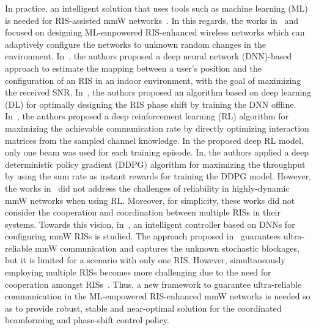 \documentclass[conference]{IEEEtran}
\begin{document}
In practice, an intelligent solution that uses tools such as  machine learning (ML) is needed for RIS-assisted mmW networks~\cite{Park2019}. In this regards, the works in~\cite{128,129,144,142} and~\cite{Globecome2019} focused on designing ML-empowered RIS-enhanced wireless networks which can adaptively configure the networks  to unknown random changes in the environment. In~\cite{128}, the authors proposed a deep neural network (DNN)-based approach to estimate the mapping between a user's position and the configuration of an RIS in an indoor environment, with the goal of maximizing the received SNR. In~\cite{129}, the authors proposed an algorithm based on deep learning (DL) for optimally designing the RIS phase shift by training the DNN offline. In~\cite{144}, the authors proposed a deep reinforcement learning (RL) algorithm for maximizing the achievable communication rate by directly optimizing interaction matrices from the sampled channel knowledge. In the proposed deep RL model, only one beam was used for each training episode. In\cite{142}, the authors applied a deep deterministic policy gradient (DDPG) algorithm for maximizing the throughput by using the sum rate as instant rewards for training the DDPG model. However, the works in~\cite{128,129,144,142} did not address the challenges of reliability in highly-dynamic mmW networks when using RL. Moreover, for simplicity, these works did not consider the cooperation and coordination between multiple RISs in their systems. Towards this vision, in~\cite{Globecome2019}, an intelligent controller based on DNNs for configuring mmW RISs is studied. The approach proposed in~\cite{Globecome2019} guarantees ultra-reliable mmW communication and captures the unknown stochastic blockages, but it is limited for a scenario with only one RIS. However, simultaneously employing multiple RISs becomes more challenging due to the need for cooperation amongst RISs~\cite{9424177}. Thus, a new framework to guarantee ultra-reliable communication in the ML-empowered RIS-enhanced mmW networks is needed so as to provide robust, stable and near-optimal solution for the coordinated beamforming and phase-shift control policy.
\vspace{-0.2cm}
\end{document}
